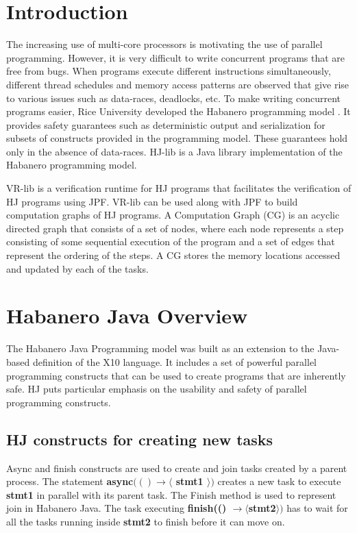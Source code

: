 \documentclass[10pt]{article}
\begin{document}
\section{Introduction}
The increasing use of multi-core processors is motivating the use of parallel programming. However, it is very difficult to write concurrent programs that are free from bugs. When programs execute different instructions simultaneously, different thread schedules and memory access patterns are observed that give rise to various issues such as data-races, deadlocks, etc. To make writing concurrent programs easier, Rice University developed the Habanero programming model \cite{Cave:2011:HNA:2093157.2093165}. It provides safety guarantees such as deterministic output and serialization for subsets of constructs provided in the programming model. These guarantees hold only in the absence of data-races. HJ-lib is a Java library implementation of the Habanero programming model.

VR-lib \cite{Anderson:2015:JVH:2693208.2693245} is a verification runtime for HJ programs that facilitates the verification of HJ programs using JPF. VR-lib can be used along with JPF to build computation graphs of HJ programs. A Computation Graph (CG) is an acyclic directed graph that consists of a set of nodes, where each node represents a step consisting of some sequential execution of the program and a set of edges that represent the ordering of the steps. A CG stores the memory locations accessed and updated by each of the tasks.

\section{Habanero Java Overview}
The Habanero Java Programming model was built as an extension to the Java-based definition of the X10 language. It includes a set of powerful parallel programming constructs that can be used to create programs that are inherently safe. HJ puts particular emphasis on the usability and safety of parallel programming constructs. 

\subsection{\textbf{HJ constructs for creating new tasks}}

Async and finish constructs are used to create and join tasks created by a parent process. The statement \textbf{async$(()  \rightarrow \langle$ stmt1 $\rangle)$} creates a new task to execute \textbf{stmt1} in parallel with its parent task. The Finish method is used to represent join in Habanero Java. The task executing \textbf{finish(() $ \rightarrow \langle$stmt2$\rangle)$} has to wait for all the tasks running inside \textbf{stmt2} to finish before it can move on.
\end{document}
